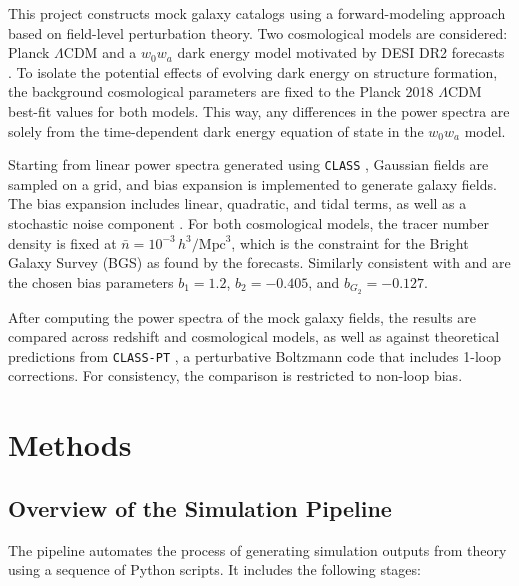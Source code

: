 \documentclass[trackchanges]{aastex7}
\begin{document}
This project constructs mock galaxy catalogs using a forward-modeling approach based on field-level perturbation theory. 
Two cosmological models are considered: Planck \(\Lambda\)CDM \citep{Planck2020} and a \( w_0w_a \) dark energy model motivated by DESI DR2 forecasts \citep{DESI2025}.
To isolate the potential effects of evolving dark energy on structure formation, the background cosmological parameters are fixed to the Planck 2018 \(\Lambda\)CDM best-fit values for both models.
This way, any differences in the power spectra are solely from the time-dependent dark energy equation of state in the \( w_0w_a \) model.

Starting from linear power spectra generated using \texttt{CLASS} \citep{CLASS2011}, Gaussian fields are sampled on a grid, and bias expansion is implemented to generate galaxy fields. 
The bias expansion includes linear, quadratic, and tidal terms, as well as a stochastic noise component \citep{Schmittfull2019}.
For both cosmological models, the tracer number density is fixed at \( \bar{n} = 10^{-3} \, h^3/\mathrm{Mpc}^3 \), which is the constraint for the Bright Galaxy Survey (BGS) as found by the \citet{DESI2025} forecasts.
Similarly consistent with \citet{DESI2016} and \citet{Chen2021} are the chosen bias parameters \( b_1 = 1.2 \), \( b_2 = -0.405 \), and \( b_{G_2} = -0.127 \). 

After computing the power spectra of the mock galaxy fields, the results are compared across redshift and cosmological models, as well as against theoretical predictions from \texttt{CLASS-PT} \citep{CLASSPT2020}, a perturbative Boltzmann code that includes 1-loop corrections. 
For consistency, the comparison is restricted to non-loop bias.

\section{Methods} \label{sec:methods}
\subsection{Overview of the Simulation Pipeline} \label{sec:pipeline_overview}

The pipeline automates the process of generating simulation outputs from theory using a sequence of Python scripts. It includes the following stages:
\end{document}
